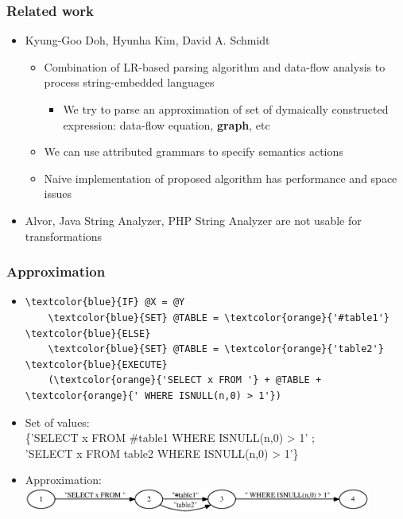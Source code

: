 \documentclass{beamer}
\begin{document}
\begin{frame}
	\transwipe[direction=90]
	\frametitle{Related work}
	\begin{itemize}
		\item Kyung-Goo Doh, Hyunha Kim, David A. Schmidt
			\begin{itemize}
			    \item Combination of LR-based parsing algorithm and data-flow analysis to process string-embedded languages
    			\begin{itemize}
			        \item We try to parse an approximation of set of dymaically constructed expression: data-flow equation, \textbf{graph}, etc
            	\end{itemize}
			    \item We can use attributed grammars to specify semantics actions
			    \item Naive implementation of proposed algorithm has performance and space issues
        	\end{itemize}
    	\item Alvor, Java String Analyzer, PHP String Analyzer are not usable for transformations
	\end{itemize}
\end{frame}

\begin{frame}[fragile]
	\transwipe[direction=90]
	\frametitle{Approximation}
	\begin{itemize}
	\item
		\begin{Verbatim}[commandchars=\\\{\}]
\textcolor{blue}{IF} @X = @Y
    \textcolor{blue}{SET} @TABLE = \textcolor{orange}{'#table1'}
\textcolor{blue}{ELSE}
    \textcolor{blue}{SET} @TABLE = \textcolor{orange}{'table2'}
\textcolor{blue}{EXECUTE} 
    (\textcolor{orange}{'SELECT x FROM '} + @TABLE + \textcolor{orange}{' WHERE ISNULL(n,0) > 1'})
		\end{Verbatim}
     	\item Set of values: \\ \{'SELECT x FROM \#table1 WHERE ISNULL(n,0) > 1' ; \\ \vspace{2pt} 'SELECT x FROM table2 WHERE ISNULL(n,0) > 1'\}
    	\item Approximation: 
                \includegraphics[width = 0.9\textwidth]{./dot/approximation1.eps}

	\end{itemize}
\end{frame}
\end{document}
